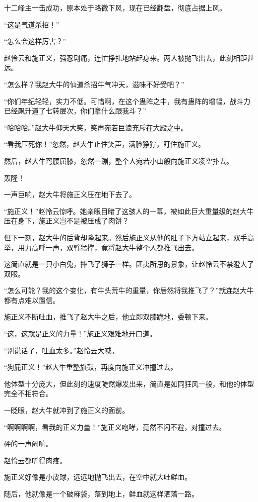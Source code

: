 \begin{this_body}
十二峰主一击成功，原本处于略微下风，现在已经翻盘，彻底占据上风。

“这是气道杀招！”

“怎么会这样厉害？”

赵怜云和施正义，强忍剧痛，连忙挣扎地站起身来。两人被抛飞出去，此刻相距甚远。

“怎么样？我赵大牛的仙道杀招牛气冲天，滋味不好受吧？”

“你们年纪轻轻，实力不低。可惜啊，在这个蛊阵之中，我有蛊阵的增幅，战斗力已经飙升道了七转层次，你们拿什么跟我斗？”

“哈哈哈。”赵大牛仰天大笑，笑声宛若巨浪充斥在大殿之中。

“看我压死你！”忽然，赵大牛止住笑声，满脸狰狞，盯住施正义。

然后，赵大牛弯腰屈膝，忽然一蹦，整个人宛若小山般向施正义凌空扑去。

轰隆！

一声巨响，赵大牛将施正义压在地下去了。

“施正义！”赵怜云惊呼。她亲眼目睹了这骇人的一幕，被如此巨大重量级的赵大牛压在身下，施正义岂不是被压成了肉饼？

但下一刻，赵大牛的后背却隆起来。然后施正义从他的肚子下方站立起来，双手高举，用力高呼一声，双臂猛撑，竟将赵大牛整个人都推飞出去。

这简直就是一只小白兔，摔飞了狮子一样。匪夷所思的景象，让赵怜云不禁瞪大了双眼。

“怎么可能？我的这个变化，有牛头荒牛的重量，你居然将我推飞了？”就连赵大牛都有点难以置信。

施正义不断吐血，推飞了赵大牛之后，他立即双膝跪地，委顿下来。

“这，这就是正义的力量！”施正义艰难地开口道。

“别说话了，吐血太多。”赵怜云大喊。

“狗屁正义！”赵大牛重整旗鼓，再度向施正义冲撞过去。

他体型十分庞大，但此刻的速度陡然爆发出来，简直是如同狂风一般，和他的体型完全不相符合。

一眨眼，赵大牛就冲到了施正义的面前。

“啊啊啊啊，看我的正义力量！”施正义咆哮，竟然不闪不避，对撞过去。

砰的一声闷响。

赵怜云都听得肉疼。

施正义好像是小皮球，远远地抛飞出去，在空中就大吐鲜血。

随后，他就像是一个破麻袋，落到地上，鲜血就这样洒落一路。


\end{this_body}
